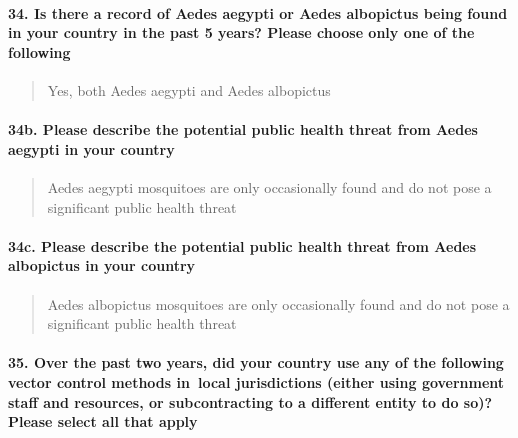 \documentclass[
]{article}
\begin{document}
\hypertarget{is-there-a-record-of-aedes-aegypti-or-aedes-albopictus-being-found-in-your-country-in-the-past-5-years-please-choose-only-one-of-the-following}{%
\paragraph{34. Is there a record of Aedes aegypti or Aedes albopictus
being found in your country in the past 5 years? Please choose only one
of the
following}\label{is-there-a-record-of-aedes-aegypti-or-aedes-albopictus-being-found-in-your-country-in-the-past-5-years-please-choose-only-one-of-the-following}}

\begin{quote}
Yes, both Aedes aegypti and Aedes albopictus
\end{quote}

\hypertarget{b.-please-describe-the-potential-public-health-threat-from-aedes-aegypti-in-your-country}{%
\paragraph{34b. Please describe the potential public health threat from
Aedes aegypti in your
country}\label{b.-please-describe-the-potential-public-health-threat-from-aedes-aegypti-in-your-country}}

\begin{quote}
Aedes aegypti mosquitoes are only occasionally found and do not pose a
significant public health threat
\end{quote}

\hypertarget{c.-please-describe-the-potential-public-health-threat-from-aedes-albopictus-in-your-country}{%
\paragraph{34c. Please describe the potential public health threat from
Aedes albopictus in your
country}\label{c.-please-describe-the-potential-public-health-threat-from-aedes-albopictus-in-your-country}}

\begin{quote}
Aedes albopictus mosquitoes are only occasionally found and do not pose
a significant public health threat
\end{quote}

\hypertarget{over-the-past-two-years-did-your-country-use-any-of-the-following-vector-control-methods-in-local-jurisdictions-either-using-government-staff-and-resources-or-subcontracting-to-a-different-entity-to-do-so-please-select-all-that-apply}{%
\paragraph{35. Over the past two years, did your country use any of the
following vector control methods in~local jurisdictions (either using
government staff and resources, or subcontracting to a different entity
to do so)? Please select all that
apply}\label{over-the-past-two-years-did-your-country-use-any-of-the-following-vector-control-methods-in-local-jurisdictions-either-using-government-staff-and-resources-or-subcontracting-to-a-different-entity-to-do-so-please-select-all-that-apply}}
\end{document}
